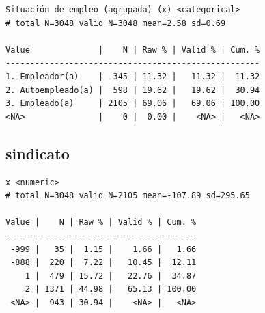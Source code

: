 \documentclass[
  letterpaper,
  DIV=11,
  numbers=noendperiod]{scrreprt}
\newenvironment{Shaded}{\begin{snugshade}}{\end{snugshade}}
\newcommand{\FunctionTok}[1]{\textcolor[rgb]{0.28,0.35,0.67}{#1}}
\newcommand{\NormalTok}[1]{\textcolor[rgb]{0.00,0.23,0.31}{#1}}
\newcommand{\SpecialCharTok}[1]{\textcolor[rgb]{0.37,0.37,0.37}{#1}}
\begin{document}
\begin{verbatim}
Situación de empleo (agrupada) (x) <categorical> 
# total N=3048 valid N=3048 mean=2.58 sd=0.69

Value              |    N | Raw % | Valid % | Cum. %
----------------------------------------------------
1. Empleador(a)    |  345 | 11.32 |   11.32 |  11.32
2. Autoempleado(a) |  598 | 19.62 |   19.62 |  30.94
3. Empleado(a)     | 2105 | 69.06 |   69.06 | 100.00
<NA>               |    0 |  0.00 |    <NA> |   <NA>
\end{verbatim}

\hypertarget{sindicato}{%
\subsection{sindicato}\label{sindicato}}

\begin{Shaded}
\end{Shaded}

\begin{verbatim}
x <numeric> 
# total N=3048 valid N=2105 mean=-107.89 sd=295.65

Value |    N | Raw % | Valid % | Cum. %
---------------------------------------
 -999 |   35 |  1.15 |    1.66 |   1.66
 -888 |  220 |  7.22 |   10.45 |  12.11
    1 |  479 | 15.72 |   22.76 |  34.87
    2 | 1371 | 44.98 |   65.13 | 100.00
 <NA> |  943 | 30.94 |    <NA> |   <NA>
\end{verbatim}
\end{document}
